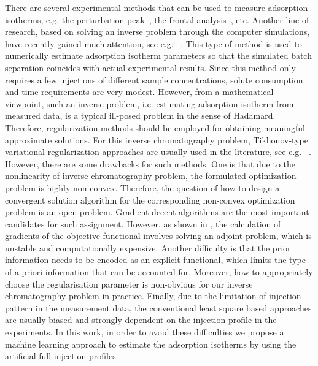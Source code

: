 \documentclass[thmsa,onecolumn,12pt]{article}%
\begin{document}
There are several experimental methods that can be used to measure adsorption isotherms, e.g. the perturbation peak~\cite{DoseJacobson-91}, the frontal analysis~\cite{Lisec-01}, etc. Another line of research, based on solving an inverse problem through the computer simulations, have recently gained much attention, see e.g. ~\cite{FelingerZhou-03,ForssENFornstedt-15,ForssenArnell-06,zhang2016regularization}. This type of method is used to numerically estimate adsorption isotherm parameters so that the simulated batch separation coincides with actual experimental results. Since this method only requires a few injections of different sample concentrations, solute consumption and time requirements are very modest. However, from a mathematical viewpoint, such an inverse problem, i.e. estimating adsorption isotherm from measured data, is a typical ill-posed problem in the sense of Hadamard. Therefore, regularization methods should be employed for obtaining meaningful approximate solutions. For this inverse chromatography problem, Tikhonov-type variational regularization approaches are usually used in the literature, see e.g. ~\cite{ChengLin2018,James-94,zhang2016regularization,LinZhang2018}. However, there are some drawbacks for such methods. One is that due to the nonlinearity of inverse chromatography problem, the formulated optimization problem is highly non-convex. Therefore, the question of how to design a convergent solution algorithm for the corresponding non-convex optimization problem is an open problem. Gradient decent algorithms are the most important candidates for such assignment. However, as shown in \cite{zhang2016}, the calculation of gradients of the objective functional involves solving an adjoint problem, which is unstable and computationally expensive. Another difficulty is that the prior information needs to be encoded as an explicit functional, which limits the type of a priori information that can be accounted for. Moreover, how to appropriately choose the regularisation parameter is non-obvious for our inverse chromatography problem in practice. Finally, due to the limitation of injection pattern in the measurement data, the conventional least square based approaches are usually biased and strongly dependent on the injection profile in the experiments.  In this work, in order to avoid these difficulties we propose a machine learning approach to estimate the adsorption isotherms by using the artificial full injection profiles.
\end{document}
